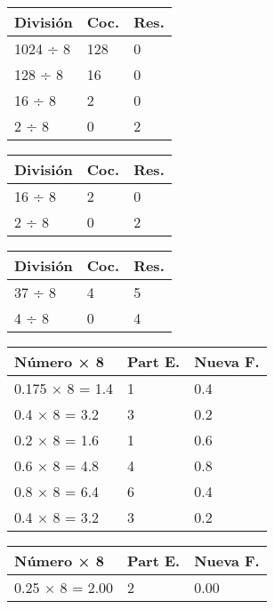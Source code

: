 \documentclass[12pt]{article}
\begin{document}
\begin{table}[H]
\centering
\begin{minipage}[t]{0.32\textwidth}
\centering
\begin{tabular}{lll}
\toprule
\textbf{División} & \textbf{Coc.} & \textbf{Res.} \\
\midrule
1024 ÷ 8 & 128 & 0 \\
128 ÷ 8 & 16 & 0 \\
16 ÷ 8 & 2 & 0 \\
2 ÷ 8 & 0 & 2 \\
\bottomrule
\end{tabular}
\end{minipage}
\hfill
\begin{minipage}[t]{0.32\textwidth}
\centering
\begin{tabular}{lll}
\toprule
\textbf{División} & \textbf{Coc.} & \textbf{Res.} \\
\midrule
16 ÷ 8 & 2 & 0 \\
2 ÷ 8 & 0 & 2 \\
\bottomrule
\end{tabular}
\end{minipage}
\hfill
\begin{minipage}[t]{0.32\textwidth}
\centering
\begin{tabular}{lll}
\toprule
\textbf{División} & \textbf{Coc.} & \textbf{Res.} \\
\midrule
37 ÷ 8 & 4 & 5 \\
4 ÷ 8 & 0 & 4 \\
\bottomrule
\end{tabular}
\end{minipage}
\end{table}
	

\begin{table}[H]
\centering
\begin{minipage}[t]{0.48\textwidth}
\centering
\begin{tabular}{lll}
\toprule
\textbf{Número × 8} & \textbf{Part E.} & \textbf{Nueva F.} \\
\midrule
0.175 × 8 = 1.4 & 1 & 0.4 \\
0.4 × 8 = 3.2 & 3 & 0.2 \\
0.2 × 8 = 1.6 & 1 & 0.6 \\
0.6 × 8 = 4.8 & 4 & 0.8 \\
0.8 × 8 = 6.4 & 6 & 0.4 \\
0.4 × 8 = 3.2 & 3 & 0.2 \\
\bottomrule
\end{tabular}
\end{minipage}
\hfill
\begin{minipage}[t]{0.48\textwidth}
\centering
\begin{tabular}{lll}
\midrule
\textbf{Número × 8} & \textbf{Part E.} & \textbf{Nueva F.} \\
\midrule
0.25 × 8 = 2.00 & 2 & 0.00 \\
\bottomrule
\end{tabular}
\end{minipage}
\end{table}
\end{document}
